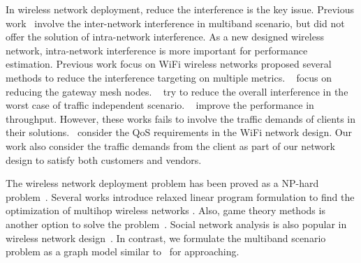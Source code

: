 In wireless network deployment, reduce the interference is the key issue.
Previous work~\cite{pcuiwinmee} involve the inter-network interference in
multiband scenario, but did not offer the solution of intra-network interference.
As a new designed wireless network, intra-network interference is 
more important for performance estimation. Previous work focus on
WiFi wireless networks proposed several methods to reduce the 
interference targeting on multiple metrics.
~\cite{tang2005interference,he2008optimizing,robinson2010deploying}
focus on reducing the gateway mesh nodes. ~\cite{irwin2013resource,subramanian2008minimum} try to reduce the
overall interference in the worst case of traffic independent scenario.
~\cite{chieochan2013channel,li2012channel} improve the performance
in throughput. However, these works fails to involve the traffic demands
of clients in their solutions.~\cite{robinson2010deploying,long2013fair} consider
the QoS requirements in the WiFi network design. Our work also
consider the traffic demands from the client as part of our 
network design to satisfy both customers and vendors.



The wireless network deployment problem has been 
proved as a NP-hard problem~\cite{si2010overview}. 
Several works introduce relaxed linear program formulation 
to find the optimization of multihop wireless networks 
\cite{tang2005interference,irwin2013resource,filippini2013new}.  
Also, game theory methods is another option to solve 
the problem~\cite{raniwala2005architecture,
wang2010game}.  
Social network analysis is also popular in wireless 
network design~\cite{zhu2013survey}.
In contrast, we formulate the multiband scenario problem
as a graph model similar to~\cite{robinson2010deploying}
for approaching.

